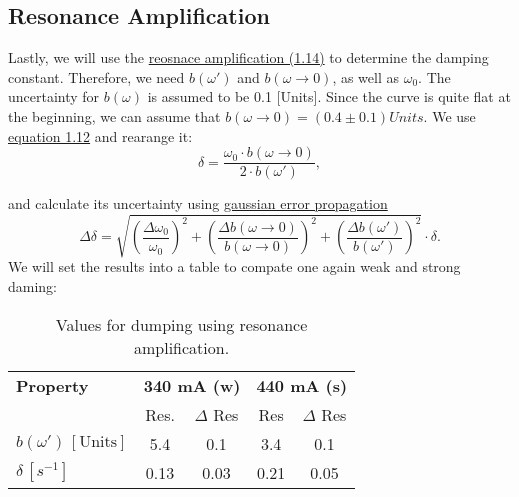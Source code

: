 \subsection*{Resonance Amplification}
Lastly, we will use the \hyperref[eq:reso_amp]{reosnace amplification (1.14)} to determine the damping constant. Therefore, we need $b(\omega')$ and $b(\omega \to 0)$, as well as $\omega_0$.
The uncertainty for $b(\omega)$ is assumed to be 0.1 [Units]. Since the curve is quite flat at the beginning, we can assume that $b(\omega \to 0) = (0.4 \pm 0.1) Units$. 
We use \hyperref[eq:reso_amp]{equation 1.12} and rearange it:
\begin{equation}
    \delta = \frac{\omega_0 \cdot b(\omega \to 0)}{2 \cdot b(\omega')},
\end{equation}

and calculate its uncertainty using \hyperref[eq:gauss_fehlfortpflanzung]{gaussian error propagation}
\begin{equation}
    \Delta \delta = \sqrt{\left(\frac{\Delta \omega_0}{\omega_0}\right)^2 + \left(\frac{\Delta b(\omega \to 0)}{b(\omega \to 0)}\right)^2 + \left(\frac{\Delta b(\omega')}{b(\omega')}\right)^2} \cdot \delta.
\end{equation}
We will set the results into a table to compate one again weak and strong daming:
\begin{table}[t!]
    \centering
    \begin{tabular}{l | c c | c c}
        \toprule
        \textbf{Property} & \multicolumn{2}{c|}{\textbf{340 mA (w)}} & \multicolumn{2}{c}{\textbf{440 mA (s)}} \\
        & Res. & $\Delta$ Res & Res & $\Delta$ Res \\
        \hline
        $b(\omega') \,[\text{Units}]$ & 5.4 & 0.1 & 3.4 & 0.1 \\
        $\delta \, [s^{-1}]$ & 0.13 & 0.03 & 0.21 & 0.05 \\
        \bottomrule
    \end{tabular}
    \caption{Values for dumping using resonance amplification.}
    \label{tab:res_amp}
\end{table}

